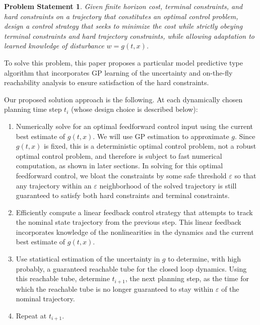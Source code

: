 \documentclass{IEEEojcsys}
\newtheorem*{problem*}{Problem Statement}
\begin{document}
\begin{problem*}
Given finite horizon cost, terminal constraints, and hard constraints on a trajectory that constitutes an optimal control problem, design a control strategy that seeks to minimize the cost while strictly obeying terminal constraints and hard trajectory constraints, while allowing adaptation to learned knowledge of disturbance $w=g(t,x)$.
\end{problem*}

To solve this problem, this paper proposes a particular model predictive type algorithm that incorporates \ac{GP} learning of the uncertainty and on-the-fly reachability analysis to ensure satisfaction of the hard constraints.

Our proposed solution approach is the following. At each dynamically chosen planning time step $t_i$ (whose design choice is described below):
\begin{enumerate}
\item Numerically solve for an optimal feedforward control input using the current best estimate of $g(t,x)$. We will use \ac{GP} estimation to approximate $g$. Since $g(t,x)$ is fixed, this is a deterministic optimal control problem, not a robust optimal control problem, and therefore is subject to fast numerical computation, as shown in later sections. In solving for this optimal feedforward control, we bloat the  constraints by some safe threshold $\varepsilon$ so that any trajectory within an $\varepsilon$ neighborhood of the solved trajectory is still guaranteed to satisfy both hard constraints and terminal constraints.
\item Efficiently compute a linear feedback control strategy that attempts to track the nominal state trajectory from the previous step. This linear feedback incorporates knowledge of the nonlinearities in the dynamics and the current best estimate of $g(t,x)$.
\item Use statistical estimation of the uncertainty in $g$ to determine, with high probably, a guaranteed reachable tube for the closed loop dynamics. Using this reachable tube, determine $t_{i+1}$, the next planning step, as the time for which the reachable tube is no longer guaranteed to stay within $\varepsilon$ of the nominal trajectory. 
\item Repeat at $t_{i+1}$.
\end{enumerate}
\end{document}
